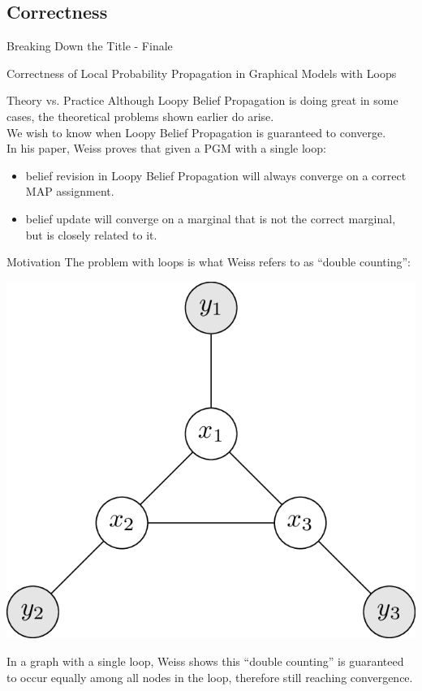 \documentclass{beamer}
\begin{document}
\subsection{Correctness}
\begin{frame}{Breaking Down the Title - Finale}
    \begin{center}
        \Large{\alert<2>{Correctness} of Local Probability Propagation in Graphical Models with \alert<1>{Loops}}
    \end{center}
\end{frame}
\begin{frame}
    \begin{block}{Theory vs. Practice}
        Although Loopy Belief Propagation is doing great in some cases, the theoretical problems shown earlier do arise.\\
        \pause We wish to know when Loopy Belief Propagation is guaranteed to converge.\\
        \pause In his paper, Weiss proves that given a PGM with a single loop:
        \pause
        \begin{itemize}[<+->]
            \item belief revision in Loopy Belief Propagation will always converge on a correct MAP assignment.
            \item belief update will converge on a marginal that is not the correct marginal, but is closely related to it.
        \end{itemize}
    \end{block}
\end{frame}
\begin{frame}
    \begin{block}{Motivation}
        The problem with loops is what Weiss refers to as ``double counting'':
        \pause
        \begin{center}
            \includegraphics[scale=0.7]{fig}
        \end{center}
        \pause
        In a graph with a single loop, Weiss shows this ``double counting'' is guaranteed to occur equally among all nodes in the loop, therefore still reaching convergence.
    \end{block}    
\end{frame}
\end{document}
